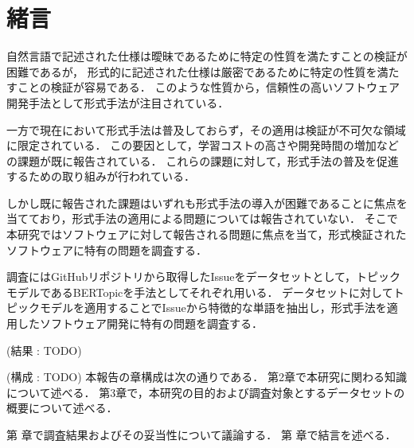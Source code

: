 \documentclass[main]{subfiles}
\begin{document}
\chapter{緒言}




自然言語で記述された仕様は曖昧であるために特定の性質を満たすことの検証が困難であるが，
形式的に記述された仕様は厳密であるために特定の性質を満たすことの検証が容易である．
このような性質から，信頼性の高いソフトウェア開発手法として形式手法が注目されている\cite{aoki:2018}．

一方で現在において形式手法は普及しておらず，その適用は検証が不可欠な領域に限定されている．
この要因として，学習コストの高さや開発時間の増加などの課題が既に報告されている\cite{reid:2020}．
これらの課題に対して，形式手法の普及を促進するための取り組みが行われている\cite{huisman:2022,ohnishi:2020}．

しかし既に報告された課題はいずれも形式手法の導入が困難であることに焦点を当てており，形式手法の適用による問題については報告されていない．
そこで本研究ではソフトウェアに対して報告される問題に焦点を当て，形式検証されたソフトウェアに特有の問題を調査する．

調査にはGitHubリポジトリから取得したIssueをデータセットとして，トピックモデルであるBERTopic\cite{grootendorst:2022}を手法としてそれぞれ用いる．
データセットに対してトピックモデルを適用することでIssueから特徴的な単語を抽出し，形式手法を適用したソフトウェア開発に特有の問題を調査する．

(結果 : TODO)

(構成 : TODO)
本報告の章構成は次の通りである．
第2章で本研究に関わる知識について述べる．
第3章で，本研究の目的および調査対象とするデータセットの概要について述べる．

第 章で調査結果およびその妥当性について議論する．
第 章で結言を述べる．
\end{document}
